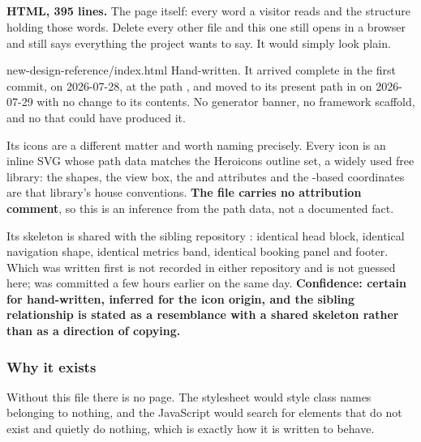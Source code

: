 \subsection{}

\textbf{HTML, 395 lines.} The page itself: every word a visitor reads and the
structure holding those words. Delete every other file and this one still opens in
a browser and still says everything the project wants to say. It would simply look
plain.

\begin{provenance}{new-design-reference/index.html}
Hand-written. It arrived complete in the first commit,  on
2026-07-28, at the path , and moved to its present path in
 on 2026-07-29 with no change to its contents. No generator banner,
no framework scaffold, and no  that could have produced it.

Its icons are a different matter and worth naming precisely. Every icon is an
inline SVG whose path data matches the Heroicons outline set, a widely used free
library: the shapes, the  view box, the  and
 attributes and the -based coordinates are that
library's house conventions. \textbf{The file carries no attribution comment}, so
this is an inference from the path data, not a documented fact.

Its skeleton is shared with the sibling repository : identical
head block, identical navigation shape, identical metrics band, identical booking
panel and footer. Which was written first is not recorded in either repository and
is not guessed here;  was committed a few hours earlier on the
same day. \textbf{Confidence: certain for hand-written, inferred for the icon
origin, and the sibling relationship is stated as a resemblance with a shared
skeleton rather than as a direction of copying.}
\end{provenance}

\subsubsection*{Why it exists}

Without this file there is no page. The stylesheet would style class names
belonging to nothing, and the JavaScript would search for elements that do not
exist and quietly do nothing, which is exactly how it is written to behave.

